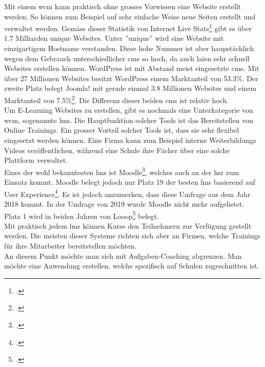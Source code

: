 Mit einem \gls{wcm} kann praktisch ohne grosses Vorwissen eine Website erstellt werden. So können zum Beispiel auf sehr einfache Weise neue Seiten erstellt und verwaltet werden. Gemäss dieser Statistik von Internet Live Stats\footcite{internet_live_stats} gibt es über 1.7 Milliarden unique Websites. Unter ''unique'' wird eine Website mit einzigartigem Hostname verstanden. Diese hohe Nummer ist aber haupstächlich wegen dem Gebrauch unterschiedlicher \gls{cms} so hoch, da auch laien sehr schnell Websites erstellen können. WordPress ist mit Abstand meist eingesetzte \gls{cms}. Mit über 27 Millionen Websites besitzt WordPress einem Marktanteil von 53.3\%. Der zweite Platz belegt Joomla! mit gerade einmal 3.8 Millionen Websites und einem Marktanteil von 7.5\%\footcite{cms_market_share}. Die Differenz dieser beiden \gls{cms} ist relativ hoch. \\

Um E-Learning Websites zu erstellen, gibt es nochmals eine Unterkategorie von \gls{wcm}, sogenannte \gls{lms}. Die Hauptfunktion solcher Tools ist das Bereitstellen von Online Trainings. Ein grosser Vorteil solcher Tools ist, dass sie sehr flexibel eingesetzt werden können. Eine Firma kann zum Beispiel interne Weiterbildungs Videos veröffentlichen, während eine Schule ihre Fächer über eine solche Plattform verwaltet. \\

Eines der wohl bekanntesten \gls{lms} ist Moodle\footcite{moodle_homepage}, welches auch an der \gls{hsr} zum Einsatz kommt. Moodle belegt jedoch nur Platz 19 der besten \gls{lms} basierend auf User Experience\footcite{moodle_ux}. Es ist jedoch anzumerken, dass diese Umfrage aus dem Jahr 2018 kommt. In der Umfrage von 2019 wurde Moodle nicht mehr aufgelistet. Platz 1 wird in beiden Jahren von Looop\footcite{looop_homepage} belegt. \\

Mit praktisch jedem \gls{lms} können Kurse den Teilnehmern zur Verfügung gestellt werden. Die meisten dieser Systeme richten sich aber an Firmen, welche Trainings für ihre Mitarbeiter bereitstellen möchten. \\

An diesem Punkt möchte man sich mit Aufgaben-Coaching abgrenzen. Man möchte eine Anwendung erstellen, welche spezifisch auf Schulen zugeschnitten ist.


